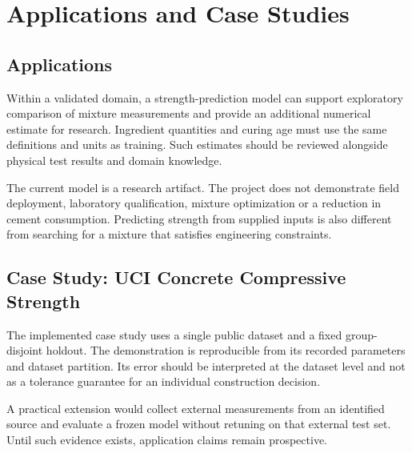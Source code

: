 \chapter{Applications and Case Studies}
\section{Applications}
Within a validated domain, a strength-prediction model can support exploratory comparison of mixture measurements and provide an additional numerical estimate for research. Ingredient quantities and curing age must use the same definitions and units as training. Such estimates should be reviewed alongside physical test results and domain knowledge.

The current model is a research artifact. The project does not demonstrate field deployment, laboratory qualification, mixture optimization or a reduction in cement consumption. Predicting strength from supplied inputs is also different from searching for a mixture that satisfies engineering constraints.
\section{Case Study: UCI Concrete Compressive Strength}
The implemented case study uses a single public dataset and a fixed group-disjoint holdout. The demonstration is reproducible from its recorded parameters and dataset partition. Its error should be interpreted at the dataset level and not as a tolerance guarantee for an individual construction decision.

A practical extension would collect external measurements from an identified source and evaluate a frozen model without retuning on that external test set. Until such evidence exists, application claims remain prospective.
